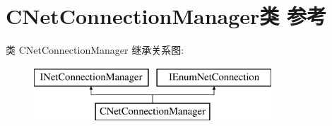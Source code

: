 \hypertarget{class_c_net_connection_manager}{}\section{C\+Net\+Connection\+Manager类 参考}
\label{class_c_net_connection_manager}
类 C\+Net\+Connection\+Manager 继承关系图\+:\begin{figure}[H]
\begin{center}
\leavevmode
\includegraphics[height=2.000000cm]{class_c_net_connection_manager}
\end{center}
\end{figure}

